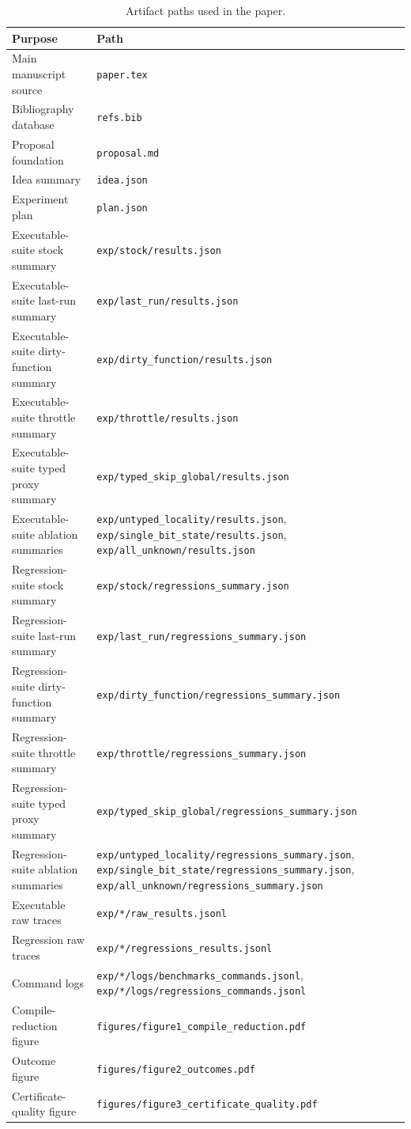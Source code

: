 \documentclass{article}
\begin{document}
\begin{table}[h]
\caption{Artifact paths used in the paper.}
\label{tab:artifact-paths}
\centering
\small
\begin{tabular}{ll}
\toprule
Purpose & Path \\
\midrule
Main manuscript source & \texttt{paper.tex} \\
Bibliography database & \texttt{refs.bib} \\
Proposal foundation & \texttt{proposal.md} \\
Idea summary & \texttt{idea.json} \\
Experiment plan & \texttt{plan.json} \\
Executable-suite stock summary & \texttt{exp/stock/results.json} \\
Executable-suite last-run summary & \texttt{exp/last\_run/results.json} \\
Executable-suite dirty-function summary & \texttt{exp/dirty\_function/results.json} \\
Executable-suite throttle summary & \texttt{exp/throttle/results.json} \\
Executable-suite typed proxy summary & \texttt{exp/typed\_skip\_global/results.json} \\
Executable-suite ablation summaries & \texttt{exp/untyped\_locality/results.json}, \texttt{exp/single\_bit\_state/results.json}, \texttt{exp/all\_unknown/results.json} \\
Regression-suite stock summary & \texttt{exp/stock/regressions\_summary.json} \\
Regression-suite last-run summary & \texttt{exp/last\_run/regressions\_summary.json} \\
Regression-suite dirty-function summary & \texttt{exp/dirty\_function/regressions\_summary.json} \\
Regression-suite throttle summary & \texttt{exp/throttle/regressions\_summary.json} \\
Regression-suite typed proxy summary & \texttt{exp/typed\_skip\_global/regressions\_summary.json} \\
Regression-suite ablation summaries & \texttt{exp/untyped\_locality/regressions\_summary.json}, \texttt{exp/single\_bit\_state/regressions\_summary.json}, \texttt{exp/all\_unknown/regressions\_summary.json} \\
Executable raw traces & \texttt{exp/*/raw\_results.jsonl} \\
Regression raw traces & \texttt{exp/*/regressions\_results.jsonl} \\
Command logs & \texttt{exp/*/logs/benchmarks\_commands.jsonl}, \texttt{exp/*/logs/regressions\_commands.jsonl} \\
Compile-reduction figure & \texttt{figures/figure1\_compile\_reduction.pdf} \\
Outcome figure & \texttt{figures/figure2\_outcomes.pdf} \\
Certificate-quality figure & \texttt{figures/figure3\_certificate\_quality.pdf} \\
\bottomrule
\end{tabular}
\end{table}
\end{document}
